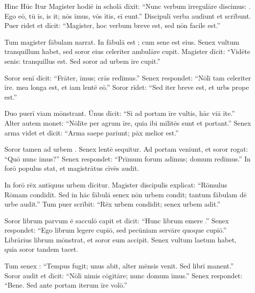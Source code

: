 \documentclass[12pt]{nextbook}
\begin{document}
\begin{readersection}{Hinc Hūc Itur}
Magister hodiē in scholā dīxit: “Nunc verbum īrregulāre discimus: . Ego eō, tū īs, is it; nōs īmus, vōs ītis, eī eunt.” Discipulī verba audiunt et scrībunt. Puer ridet et dīcit: “Magister, hoc verbum breve est, sed nōn facile est.”

Tum magister fābulam narrat. In fābulā est ; cum sene est  eius. Senex vultum tranquillum habet, sed soror eius celeriter ambulāre cupit. Magister dīcit: “Vidēte  senis: tranquillus est. Sed soror ad urbem īre cupit.”

Soror senī dīcit: “Frāter,  īmus;  crās redīmus.” Senex respondet: “Nōlī tam celeriter īre.  mea longa est, et iam lentē eō.” Soror rīdet: “Sed iter breve est, et urbs prope est.”

Duo puerī viam mōnstrant. Ūnus dīcit: “Si ad portam īre vultis, hāc viā īte.” Alter autem monet: “Nōlīte per agrum īre, quia ibi mīlitēs sunt et  portant.” Senex arma videt et dīcit: “Arma saepe  pariunt; pāx melior est.”

Soror tamen ad urbem . Senex lentē sequitur. Ad portam veniunt, et soror rogat: “Quō nunc īmus?” Senex respondet: “Prīmum forum adīmus;  domum redīmus.” In forō populus stat, et magistrātus cīvēs audit.

In forō rēx antīquus urbem  dīcitur. Magister discipulīs explicat: “Rōmulus Rōmam condidit. Sed in hāc fābulā senex nōn urbem condit; tantum fābulam dē urbe audit.” Tum puer scrībit: “Rēx urbem condidit; senex urbem adit.”

Soror librum parvum ē sacculō capit et dīcit: “Hunc librum emere .” Senex respondet: “Ego librum legere cupiō, sed pecūniam servāre quoque cupiō.” Librārius librum mōnstrat, et soror eum accipit. Senex vultum laetum habet, quia soror tandem tacet.

Tum senex : “Tempus fugit; unus  abit, alter mēnsis venit. Sed librī manent.” Soror audit et dīcit: “Nōlī nimis cōgitāre; nunc domum īmus.” Senex respondet: “Bene. Sed ante portam iterum īre volō.”


\end{readersection}
\end{document}

